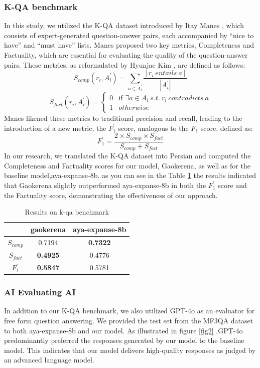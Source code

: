\documentclass[conference]{IEEEtran}
\begin{document}
\subsubsection{K-QA benchmark}
In this study, we utilized the K-QA dataset introduced by Itay Manes
\cite{b19}
, which consists of expert-generated question-answer pairs, each accompanied by “nice to have” and “must have” lists. Manes proposed two key metrics, Completeness and Factuality, which are essential for evaluating the quality of the question-answer pairs. These metrics, as reformulated by Hyunjae Kim
\cite{b8}
, are defined as follows:  
\[
S_{comp}(r_i,A_i^{\prime}) =  \sum_{a \in A_i^{\prime}} \frac{[r_i \: entails \: a]}{|A_i^{\prime}|}
\]
\[
S_{fact}(r_i,A_i^{\prime}) = 
\begin{cases} 
	0 & \text{if } \exists a \in A_i \: s.t.  \: r_i \: contradicts \: a\\ 
	1 & otherwise
\end{cases}
\]
Manes likened these metrics to traditional precision and recall, leading to the introduction of a new metric, the $F_{1}^{\prime}$ score, analogous to the $F_{1}$ score, defined as: 
\[
F_{1}^{\prime} = \frac{2 \times S_{comp} \times S_{fact}}{S_{comp} + S_{fact}}
\]
In our research, we translated the K-QA dataset into Persian and computed the Completeness and Factuality scores for our model, Gaokerena, as well as for the baseline model,aya-expanse-8b. as you can see in the Table
\ref{tab:model_accuracy_on_ffqa}
the results indicated that Gaokerena slightly outperformed aya-expanse-8b in both the $F_{1}^{\prime}$ score and the Factuality score, demonstrating the effectiveness of our approach.

\begin{table}[ht]
	\centering
	\caption{Results on k-qa benchmark}
	\begin{tabular}{|c|c|c|} %
		\hline
		\textbf{} & \textbf{gaokerena} & \textbf{aya-expanse-8b} \\ 
		\hline
		$S_{comp}$ & 0.7194 & \textbf{0.7322} \\ 
		\hline
		$S_{fact}$ & \textbf{0.4925} & 0.4776 \\ 
		\hline
		$F_{1}^{\prime}$ & \textbf{0.5847} & 0.5781 \\ 
		\hline
	\end{tabular}
	\label{tab:model_accuracy_on_ffqa}
\end{table}

\subsubsection{AI Evaluating AI}
In addition to our K-QA benchmark, we also utilized GPT-4o
\cite{b20}
as an evaluator for free form question answering. We provided the test set from the MF3QA dataset to both aya-expanse-8b and our model. As illustrated in figure
\ref{fig2}
,GPT-4o predominantly preferred the responses generated by our model to the baseline model. This indicates that our model delivers high-quality responses as judged by an advanced language model.
\end{document}
